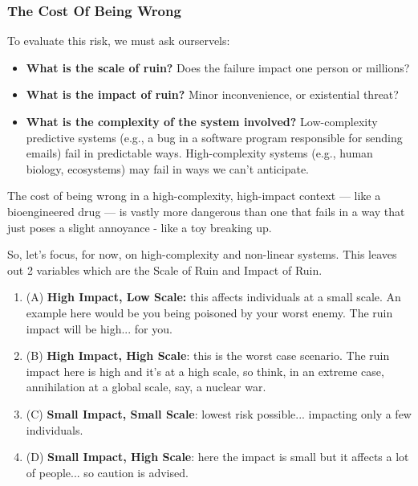 \subsubsection{The Cost Of Being Wrong}
To evaluate this risk, we must ask ourservels:

\begin{itemize}
	\item \textbf{What is the scale of ruin?} Does the failure impact one person or millions?
	\item \textbf{What is the impact of ruin?} Minor inconvenience, or existential threat?
	\item \textbf{What is the complexity of the system involved?} Low-complexity predictive systems (e.g., a bug in a software program responsible for sending emails) fail in predictable ways. High-complexity systems (e.g., human biology, ecosystems) may fail in ways we can’t anticipate.
\end{itemize}

The cost of being wrong in a high-complexity, high-impact context — like a bioengineered drug — is vastly more dangerous than one that fails in a way that just poses a slight annoyance - like a toy breaking up. 

So, let's focus, for now, on high-complexity and non-linear systems. This leaves out 2 variables which are the Scale of Ruin and Impact of Ruin.

\begin{center}
\end{center}

\begin{enumerate}
	\item (A) \textbf{High Impact, Low Scale:} this affects individuals at a small scale. An example here would be you being poisoned by your worst enemy. The ruin impact will be high... for you.
	\item (B) \textbf{High Impact, High Scale}: this is the worst case scenario. The ruin impact here is high and it's at a high scale, so think, in an extreme case, annihilation at a global scale, say, a nuclear war.
	\item (C) \textbf{Small Impact, Small Scale}: lowest risk possible... impacting only a few individuals.
	\item (D) \textbf{Small Impact, High Scale}: here the impact is small but it affects a lot of people... so caution is advised.
\end{enumerate}

